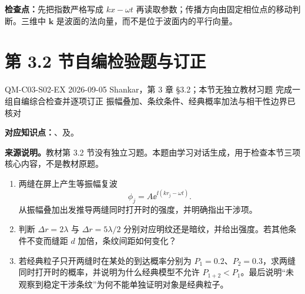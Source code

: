 \textbf{检查点：}先把指数严格写成 $kx-\omega t$ 再读取参数；传播方向由固定相位点的移动判断。三维中 $\bm k$ 是波面的法向量，而不是位于波面内的平行向量。

\section{第 3.2 节自编检验题与订正}
\label{exercise-set:QM-C03-S02}

\exercisemeta
  {QM-C03-S02-EX}
  {2026-09-05}
  {Shankar，第 3 章 \S 3.2；本节无独立教材习题}
  {完成一组自编综合检查并逐项订正}
  {振幅叠加、条纹条件、经典概率加法与相干性边界已核对}


\textbf{对应知识点：}、及。

\textbf{来源说明。}教材第 3.2 节没有独立习题。本题由学习对话生成，用于检查本节三项核心内容，不是教材原题。

\begin{enumerate}[leftmargin=*]
  \item 两缝在屏上产生等振幅复波
  \[
    \phi_j=A\ee^{\ii(kr_j-\omega t)}.
  \]
  从振幅叠加出发推导两缝同时打开时的强度，并明确指出干涉项。
  \item 判断 $\Delta r=2\lambda$ 与 $\Delta r=5\lambda/2$ 分别对应明纹还是暗纹，并给出强度。若其他条件不变而缝距 $d$ 加倍，条纹间距如何变化？
  \item 若经典粒子只开两缝时在某处的到达概率分别为 $P_1=0.2$、$P_2=0.3$，求两缝同时打开时的概率，并说明为什么经典模型不允许 $P_{1+2}<P_1$。最后说明“未观察到稳定干涉条纹”为何不能单独证明对象是经典粒子。
\end{enumerate}

